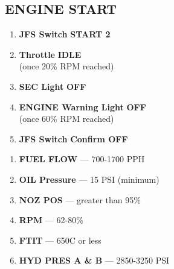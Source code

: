 \subsection{ENGINE START}
\begin{checklistenumerate}
    \cbstart
    \begin{enumerate}
        \item \textbf{JFS Switch} \dotfill \textbf{START 2}
        \item \textbf{Throttle} \dotfill \textbf{IDLE} \\
        \hfill (once 20\% RPM reached)
        \item \textbf{SEC Light} \dotfill \textbf{OFF} 
        \item \textbf{ENGINE Warning Light} \dotfill \textbf{OFF} \\
        \hfill (once 60\% RPM reached)
        \item \textbf{JFS Switch} \dotfill \textbf{Confirm OFF}
    \end{enumerate}\cbend
    \begin{enumerate}
        \item \textbf{FUEL FLOW} --- 700-1700 PPH
        \item \textbf{OIL Pressure} --- 15 PSI (minimum)
        \item \textbf{NOZ POS} --- greater than 95\%
        \item \textbf{RPM} --- 62-80\% 
        \item \textbf{FTIT} --- 650C or less
        \item \textbf{HYD PRES A \& B} --- 2850-3250 PSI
    \end{enumerate}
\end{checklistenumerate}


\clearpage

